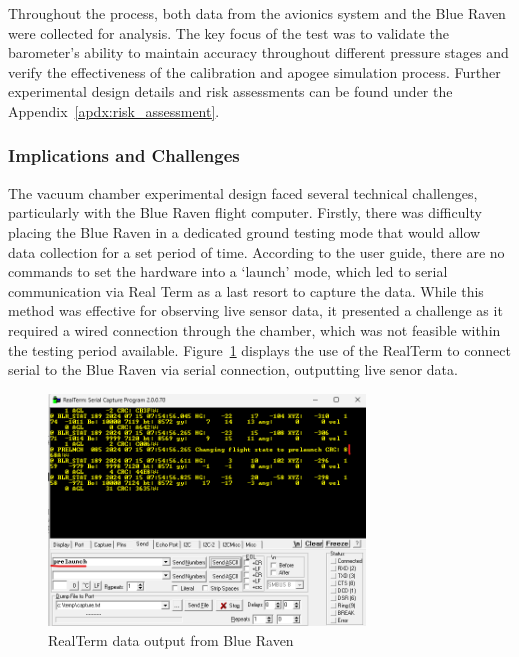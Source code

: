 Throughout the process, both data from the avionics system and the Blue Raven were collected for analysis. The key focus of the test was to validate the barometer’s ability to maintain accuracy throughout different pressure stages and verify the effectiveness of the calibration and apogee simulation process. Further experimental design details and risk assessments can be found under the Appendix~\ref{apdx:risk_assessment}. 

\subsubsection{Implications and Challenges}
The vacuum chamber experimental design faced several technical challenges, particularly with the Blue Raven flight computer. Firstly, there was difficulty placing the Blue Raven in a dedicated ground testing mode that would allow data collection for a set period of time. According to the user guide, there are no commands to set the hardware into a ‘launch’ mode, which led to serial communication via Real Term as a last resort to capture the data. While this method was effective for observing live sensor data, it presented a challenge as it required a wired connection through the chamber, which was not feasible within the testing period available. Figure~\ref{fig:realterm} displays the use of the RealTerm to connect serial to the Blue Raven via serial connection, outputting live senor data.

\begin{figure}[h]
    \begin{center}
        \includegraphics[width=0.75\textwidth]{./img/realterm.png}
    \end{center}
    \caption{RealTerm data output from Blue Raven}\label{fig:realterm}
\end{figure}


